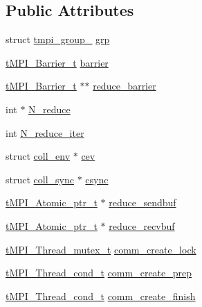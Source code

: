 \subsection*{\-Public \-Attributes}
\begin{DoxyCompactItemize}
\item 
struct \hyperlink{structtmpi__group__}{tmpi\-\_\-group\-\_\-} \hyperlink{structtmpi__comm___a9860b5f488db347c8a0ee854dd3481d4}{grp}
\item 
\hyperlink{structtMPI__Barrier__t}{t\-M\-P\-I\-\_\-\-Barrier\-\_\-t} \hyperlink{structtmpi__comm___ac8422864a7a1d06fb5c753bf829c992d}{barrier}
\item 
\hyperlink{structtMPI__Barrier__t}{t\-M\-P\-I\-\_\-\-Barrier\-\_\-t} $\ast$$\ast$ \hyperlink{structtmpi__comm___af6780e93b3bc7111bfa6b9fc36128fce}{reduce\-\_\-barrier}
\item 
int $\ast$ \hyperlink{structtmpi__comm___afe134ee32a1c3235b3a11d5cfc65e56d}{\-N\-\_\-reduce}
\item 
int \hyperlink{structtmpi__comm___a19d85522a920442a17d6af714cd88a75}{\-N\-\_\-reduce\-\_\-iter}
\item 
struct \hyperlink{structcoll__env}{coll\-\_\-env} $\ast$ \hyperlink{structtmpi__comm___a09953453b4728fd7bf78d33ae1363ef3}{cev}
\item 
struct \hyperlink{structcoll__sync}{coll\-\_\-sync} $\ast$ \hyperlink{structtmpi__comm___af819fe308d14031c37d6e539a75a515a}{csync}
\item 
\hyperlink{include_2thread__mpi_2atomic_2gcc_8h_a4c91c0105f1c0a5f23bc4239274291eb}{t\-M\-P\-I\-\_\-\-Atomic\-\_\-ptr\-\_\-t} $\ast$ \hyperlink{structtmpi__comm___a9b3525ea642fa869b35a3a629d02753c}{reduce\-\_\-sendbuf}
\item 
\hyperlink{include_2thread__mpi_2atomic_2gcc_8h_a4c91c0105f1c0a5f23bc4239274291eb}{t\-M\-P\-I\-\_\-\-Atomic\-\_\-ptr\-\_\-t} $\ast$ \hyperlink{structtmpi__comm___acfa6439f7b6888b1749cfa273b6c82ee}{reduce\-\_\-recvbuf}
\item 
\hyperlink{structtMPI__Thread__mutex__t}{t\-M\-P\-I\-\_\-\-Thread\-\_\-mutex\-\_\-t} \hyperlink{structtmpi__comm___ac58a1fb9a7ac951628b6a50f099f01d8}{comm\-\_\-create\-\_\-lock}
\item 
\hyperlink{structtMPI__Thread__cond__t}{t\-M\-P\-I\-\_\-\-Thread\-\_\-cond\-\_\-t} \hyperlink{structtmpi__comm___a3e6fa0a9e5d1c0954640e13ed1e9c6b0}{comm\-\_\-create\-\_\-prep}
\item 
\hyperlink{structtMPI__Thread__cond__t}{t\-M\-P\-I\-\_\-\-Thread\-\_\-cond\-\_\-t} \hyperlink{structtmpi__comm___a2069407ae609877aa95548587a866f9f}{comm\-\_\-create\-\_\-finish}
$$
\end{DoxyCompactItemize}
